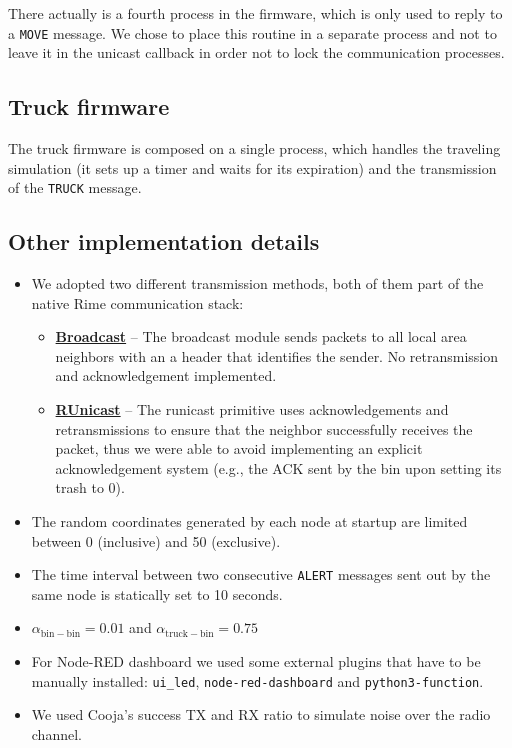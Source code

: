 \documentclass[a4paper, 11pt, parskip=half]{scrartcl}
\begin{document}
There actually is a fourth process in the firmware, which is only used to reply to a \texttt{MOVE} message. We chose to place this routine in a separate process and not to leave it in the unicast callback in order not to lock the communication processes.

\subsection{Truck firmware}

The truck firmware is composed on a single process, which handles the traveling simulation (it sets up a timer and waits for its expiration) and the transmission of the \texttt{TRUCK} message.

\subsection{Other implementation details}

\begin{itemize}
	\item We adopted two different transmission methods, both of them part of the native Rime communication stack:
		\begin{itemize}
			\item \href{http://contiki.sourceforge.net/docs/2.6/a01720.html}{\textbf{Broadcast}} -- The broadcast module sends packets to all local area neighbors with an a header that identifies the sender. No retransmission and acknowledgement implemented.
			\item \href{http://contiki.sourceforge.net/docs/2.6/a01738.html}{\textbf{RUnicast}} -- The runicast primitive uses acknowledgements and retransmissions to ensure that the neighbor successfully receives the packet, thus we were able to avoid implementing an explicit acknowledgement system (e.g., the ACK sent by the bin upon setting its trash to 0).
		\end{itemize}
	\item The random coordinates generated by each node at startup are limited between 0 (inclusive) and 50 (exclusive).
	\item The time interval between two consecutive \texttt{ALERT} messages sent out by the same node is statically set to 10 seconds.
	\item $\alpha_\mathrm{bin-bin} = 0.01$ and $\alpha_\mathrm{truck-bin} = 0.75$
	\item For Node-RED dashboard we used some external plugins that have to be manually installed: \texttt{ui\_led}, \texttt{node-red-dashboard} and \texttt{python3-function}.
	\item We used Cooja's success TX and RX ratio to simulate noise over the radio channel.
\end{itemize}
\end{document}
